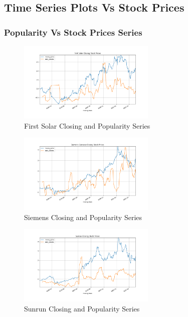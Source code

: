 \documentclass[sigconf, nonacm]{acmart}
\begin{document}
\subsection{Time Series Plots Vs Stock Prices} 
\subsubsection{Popularity  Vs Stock Prices Series} 
\begin{figure}[H]
  \centering
  \includegraphics[width=\linewidth, height =1.5in]{popularity_time_series/First Solar Closing Stock Prices_closing_price_daily_tweets.png}
  \caption{First Solar Closing and Popularity Series}
\end{figure}

\begin{figure}[H]
  \centering
  \includegraphics[width=\linewidth, height =1.5in]{popularity_time_series/Siemens Gamesa Closing Stock Prices_closing_price_daily_tweets.png}
  \caption{Siemens Closing and Popularity Series}
\end{figure}

\begin{figure}[H]
  \centering
  \includegraphics[width=\linewidth, height =1.5in]{popularity_time_series/Sunrun Closing Stock Prices_closing_price_daily_tweets.png}
  \caption{Sunrun Closing and Popularity Series}
\end{figure}
\end{document}
